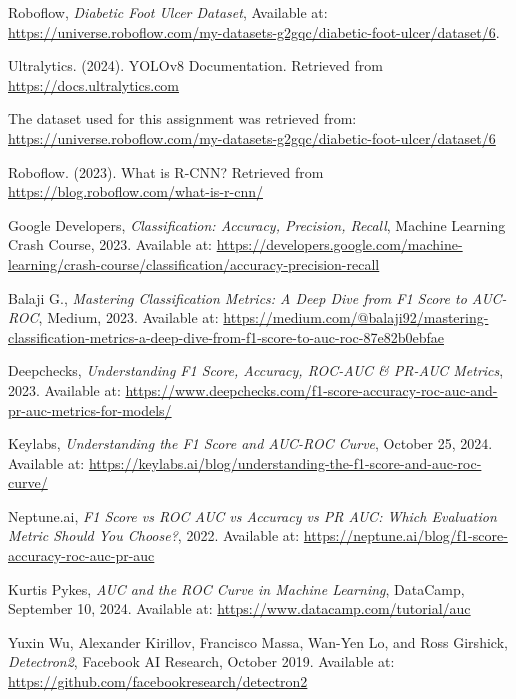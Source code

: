 \documentclass[a4paper,12pt]{report}
\begin{document}
\begin{thebibliography}{8}
Roboflow,  
\textit{Diabetic Foot Ulcer Dataset},  
Available at: \url{https://universe.roboflow.com/my-datasets-g2gqc/diabetic-foot-ulcer/dataset/6}.

Ultralytics. (2024). YOLOv8 Documentation. 
Retrieved from \url{https://docs.ultralytics.com}

The dataset used for this assignment was retrieved from: \url{https://universe.roboflow.com/my-datasets-g2gqc/diabetic-foot-ulcer/dataset/6}

Roboflow. (2023). What is R-CNN?  
Retrieved from \url{https://blog.roboflow.com/what-is-r-cnn/}

Google Developers, 
\textit{Classification: Accuracy, Precision, Recall}, 
Machine Learning Crash Course, 2023. 
Available at: \url{https://developers.google.com/machine-learning/crash-course/classification/accuracy-precision-recall}

Balaji G., 
\textit{Mastering Classification Metrics: A Deep Dive from F1 Score to AUC-ROC}, 
Medium, 2023. 
Available at: \url{https://medium.com/@balaji92/mastering-classification-metrics-a-deep-dive-from-f1-score-to-auc-roc-87e82b0ebfae}

Deepchecks,
\textit{Understanding F1 Score, Accuracy, ROC-AUC \& PR-AUC Metrics},
2023.
Available at: \url{https://www.deepchecks.com/f1-score-accuracy-roc-auc-and-pr-auc-metrics-for-models/}

Keylabs,
\textit{Understanding the F1 Score and AUC-ROC Curve},
October 25, 2024.
Available at: \url{https://keylabs.ai/blog/understanding-the-f1-score-and-auc-roc-curve/}

Neptune.ai,
\textit{F1 Score vs ROC AUC vs Accuracy vs PR AUC: Which Evaluation Metric Should You Choose?},
2022.
Available at: \url{https://neptune.ai/blog/f1-score-accuracy-roc-auc-pr-auc}

Kurtis Pykes,
\textit{AUC and the ROC Curve in Machine Learning},
DataCamp, September 10, 2024.
Available at: \url{https://www.datacamp.com/tutorial/auc}

Yuxin Wu, Alexander Kirillov, Francisco Massa, Wan-Yen Lo, and Ross Girshick,  
\textit{Detectron2},  
Facebook AI Research, October 2019.  
Available at: \url{https://github.com/facebookresearch/detectron2}


\end{thebibliography}
\end{document}
